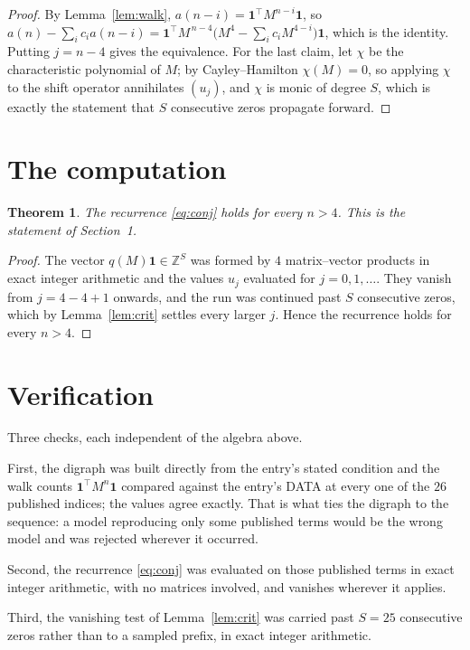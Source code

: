 \documentclass[11pt,a4paper]{article}
\theoremstyle{plain}
\newtheorem{theorem}{Theorem}
\theoremstyle{definition}
\begin{document}
\begin{proof}
By Lemma~\ref{lem:walk}, $a(n-i)=\mathbf{1}^{\!\top}M^{n-i}\mathbf{1}$, so
$a(n)-\sum_i c_i a(n-i)
=\mathbf{1}^{\!\top}M^{\,n-4}\bigl(M^{4}-\sum_i c_i M^{4-i}\bigr)
\mathbf{1}$, which is the identity. Putting $j=n-4$ gives the equivalence. For the
last claim, let $\chi$ be the characteristic polynomial of $M$; by Cayley--Hamilton
$\chi(M)=0$, so applying $\chi$ to the shift operator annihilates $(u_j)$, and $\chi$ is
monic of degree $S$, which is exactly the statement that $S$ consecutive zeros propagate
forward.
\end{proof}

\section{The computation}

\begin{theorem}
The recurrence \eqref{eq:conj} holds for every $n>4$. This is the statement of
Section~1.
\end{theorem}

\begin{proof}
The vector $q(M)\mathbf{1}\in\mathbb{Z}^{S}$ was formed by $4$ matrix--vector
products in exact integer arithmetic and the values $u_j$ evaluated for
$j=0,1,\dots$. They vanish from $j=4-4+1$ onwards, and the run was continued past
$S$ consecutive zeros, which by Lemma~\ref{lem:crit} settles every larger $j$. Hence the
recurrence holds for every $n>4$.
\end{proof}

\section{Verification}

Three checks, each independent of the algebra above.

First, the digraph was built directly from the entry's stated condition and the walk counts
$\mathbf{1}^{\!\top}M^{n}\mathbf{1}$ compared against the entry's DATA at every one of
the $26$ published indices; the values agree exactly. That is what ties the digraph to
the sequence: a model reproducing only some published terms would be the wrong model and
was rejected wherever it occurred.

Second, the recurrence \eqref{eq:conj} was evaluated on those published terms in exact
integer arithmetic, with no matrices involved, and vanishes wherever it applies.

Third, the vanishing test of Lemma~\ref{lem:crit} was carried past $S=25$ consecutive
zeros rather than to a sampled prefix, in exact integer arithmetic.
\end{document}
